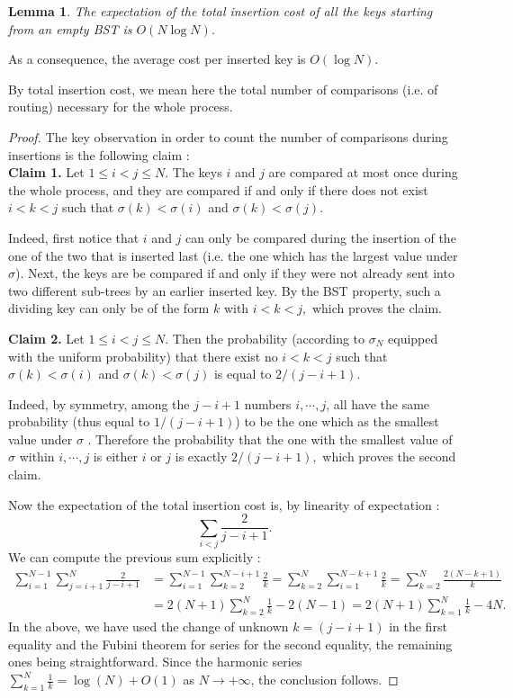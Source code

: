 \documentclass[12pt]{article}
\theoremstyle{plain}
\newtheorem{lemma}{Lemma}
\theoremstyle{remark}
\begin{document}
\begin{lemma}
The expectation of the total insertion cost of all the keys starting
from an empty BST is $O(N\log N)$.
\end{lemma}

As a consequence, the average cost per inserted key is $O(\log N)$. 

\medskip

By total insertion cost, we mean here the total number of comparisons  
(i.e. of routing) necessary for the whole process. 

\begin{proof}
	The key observation in order to count the number of comparisons during
	insertions is the following claim :\\
	{\bf Claim 1.} Let $1 \leq i < j \leq N$.  The keys $i$ and $j$ are compared at
	most once during the whole process, and they are compared if and
	only if there does not exist $i < k < j$ such that $\sigma(k) <
	\sigma(i)$ and $\sigma(k) < \sigma(j).$ 

	Indeed, first notice that $i$ and $j$ can only be compared during the insertion 
	of the one of the two that is inserted last (i.e. the one which has the largest 
	value under $\sigma$). Next, the keys are be compared if and only if
	they were not already sent into two different sub-trees by an earlier inserted 
	key. By the BST property, such a dividing key can only be of the form 
	$k$ with $i < k < j,$ which proves the claim.

	{\bf Claim 2.} Let $1 \leq i < j \leq N.$ Then the probability (according
	to $\sigma_N$ equipped with the uniform probability) that there exist no
	$i < k < j$ such that $\sigma(k) < \sigma(i)$ and $\sigma(k) <
	\sigma(j)$ is equal to $2/(j-i+1).$ 

	Indeed, by symmetry, among the $j-i+1$ numbers $i, \cdots, j$, all have the same
	probability (thus equal to $1/(j-i+1)$) to be the one which as the smallest 
	value under $\sigma$ . Therefore the probability that the one with the
	smallest value of $\sigma$ within $i,\cdots,j$ is either $i$ or $j$ is
	exactly $2/(j-i+1),$ which proves the second claim.

	Now the expectation of the total insertion cost is, by linearity of
	expectation :
	$$
	\sum_{i < j} \frac{2}{j-i+1}.
	$$
	We can compute the previous sum explicitly : 
	\begin{equation*}\begin{split}
		\sum_{i = 1}^{N-1} \sum_{j=i+1}^N \frac{2}{j-i+1} &=
		\sum_{i=1}^{N-1} \sum_{k=2}^{N-i+1} \frac{2}{k} = \sum_{k=2}^{N}
		\sum_{i = 1}^{N-k+1} \frac{2}{k} = \sum_{k=2}^N
		\frac{2(N-k+1)}{k}\\
		&= 2(N+1) \sum_{k=2}^N \frac{1}{k} - 2(N-1) = 2(N+1)\sum_{k=1}^N
		\frac{1}{k} - 4N.
	\end{split}\end{equation*}
	In the above, we have used the change of unknown $k = (j-i+1)$ in the
	first equality and the Fubini theorem for series for the second
	equality, the remaining ones being straightforward.  
	Since the harmonic series $\sum_{k=1}^N \frac{1}{k}= \log(N) + O(1)$ as $N \to
	+\infty$, the conclusion follows. 
\end{proof}
\end{document}
